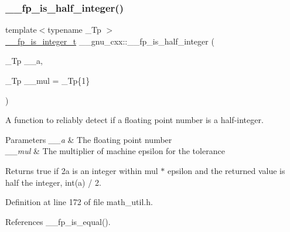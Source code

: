 \subsubsection{\texorpdfstring{\+\_\+\+\_\+fp\+\_\+is\+\_\+half\+\_\+integer()}{\_\_fp\_is\_half\_integer()}}
{\footnotesize\ttfamily template$<$typename \+\_\+\+Tp $>$ \\
\hyperlink{struct____gnu__cxx_1_1____fp__is__integer__t}{\+\_\+\+\_\+fp\+\_\+is\+\_\+integer\+\_\+t} \+\_\+\+\_\+gnu\+\_\+cxx\+::\+\_\+\+\_\+fp\+\_\+is\+\_\+half\+\_\+integer (\begin{DoxyParamCaption}\item[{\+\_\+\+Tp}]{\+\_\+\+\_\+a,  }\item[{\+\_\+\+Tp}]{\+\_\+\+\_\+mul = {\ttfamily \+\_\+Tp\{1\}} }\end{DoxyParamCaption})\hspace{0.3cm}{\ttfamily [inline]}}

A function to reliably detect if a floating point number is a half-\/integer.


\begin{DoxyParams}{Parameters}
{\em \+\_\+\+\_\+a} & The floating point number \\
\hline
{\em \+\_\+\+\_\+mul} & The multiplier of machine epsilon for the tolerance \\
\hline
\end{DoxyParams}
\begin{DoxyReturn}{Returns}
{\ttfamily true} if 2a is an integer within mul $\ast$ epsilon and the returned value is half the integer, int(a) / 2. 
\end{DoxyReturn}


Definition at line 172 of file math\+\_\+util.\+h.



References \+\_\+\+\_\+fp\+\_\+is\+\_\+equal().

\mbox{\label{namespace____gnu__cxx_af4f5d1b815527e3d8587bdbbef9470e3}} 
